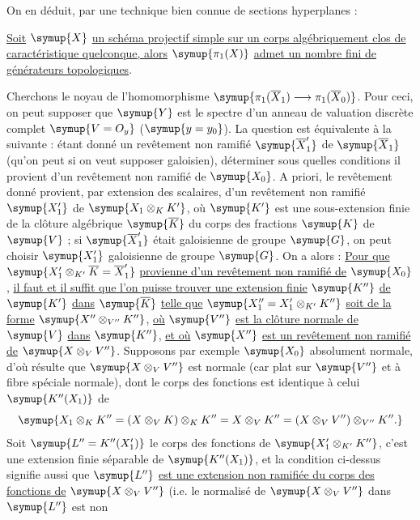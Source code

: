 On en déduit, par une technique bien connue de sections hyperplanes :

 \uline{Soit} $\symup{X}$ \uline{un schéma projectif simple sur un corps
algébriquement clos de caractéristique quelconque, alors} $\symup{\pi_1(X)}$ \uline{admet un
nombre fini de générateurs topologiques}.

Cherchons le noyau de l'homomorphisme
$\symup{\pi_1(\overline X_1)\longrightarrow\pi_1(\overline X_0)}$. Pour ceci, on peut
supposer que $\symup{Y}$ est le spectre d'un anneau de valuation discrète complet
$\symup{V=O_y}$ ($\symup{y=y_0}$). La question est équivalente à la suivante : étant donné
un revêtement non ramifié $\symup{\overline X'_1}$ de $\symup{\overline X_1}$ (qu'on peut si on
veut supposer galoisien), déterminer sous quelles conditions il provient d'un
revêtement non ramifié de $\symup{X_0}$. A priori, le revêtement donné
provient, par extension des scalaires, d'un revêtement non ramifié $\symup{X'_1}$ de
$\symup{X_1\otimes_K K'}$, où $\symup{K'}$ est une sous-extension finie de la clôture
algébrique $\symup{\overline K}$ du corps des fractions $\symup{K}$ de $\symup{V}$ ; si
$\symup{\overline X'_1}$ était galoisienne de groupe $\symup{G}$, on peut choisir $\symup{X'_1}$
galoisienne de groupe $\symup{G}$. On a alors : \uline{Pour que}
$\symup{X'_1\otimes_{K'}\overline K=\overline X'_1}$ \uline{provienne d'un revêtement non
ramifié de} $\symup{X_0}$, \uline{il faut et il suffit que l'on puisse trouver une extension
finie} $\symup{K''}$ \uline{de} $\symup{K'}$ \uline{dans} $\symup{\overline K}$ \uline{telle que}
$\symup{X''_1=X'_1\otimes_{K'}K''}$ \uline{soit de la forme} $\symup{X''\otimes_{V''}K''}$, \uline{où} $\symup{V''}$
\uline{est la clôture normale de} $\symup{V}$ \uline{dans} $\symup{K''}$, \uline{et où} $\symup{X''}$ \uline{est un revêtement non
ramifié de} $\symup{X\otimes_VV''}$. Supposons par exemple $\symup{X_0}$ absolument normale,
d'où résulte que $\symup{X\otimes_VV''}$ est normale (car plat sur $\symup{V''}$ et à fibre
spéciale normale), dont le corps des fonctions est identique à celui
$\symup{K''(X_1)}$ de
\[
  \symup{X_1\otimes_KK''
  =(X\otimes_VK)\otimes_KK''
  =X\otimes_VK''
  =(X\otimes_VV'')\otimes_{V''}K''.}
\]
Soit $\symup{L''=K''(X'_1)}$ le corps des fonctions de $\symup{X'_1\otimes_{K'}K''}$, c'est
une extension finie séparable de $\symup{K''(X_1)}$, et la condition ci-dessus signifie
aussi que $\symup{L''}$ \uline{est une extension non ramifiée du corps des fonctions de}
$\symup{X\otimes_VV''}$ (i.e. le normalisé de $\symup{X\otimes_VV''}$ dans $\symup{L''}$ est non
